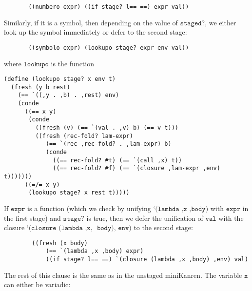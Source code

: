 \documentclass[11pt]{article}
\theoremstyle{definition}
\newcommand{\code}[1]{\texttt{#1}}
\newcommand\tab[1][1cm]{\hspace*{#1}}
\begin{document}
\begin{lstlisting}
       ((numbero expr) ((if stage? l== ==) expr val))
\end{lstlisting}
Similarly, if it is a symbol, then depending on the value of $\code{staged?}$, we either look up the symbol immediately or defer to the second stage: 
\begin{lstlisting}
       ((symbolo expr) (lookupo stage? expr env val))
\end{lstlisting}
where $\code{lookupo}$ is the function
\begin{lstlisting}
(define (lookupo stage? x env t)
  (fresh (y b rest)
    (== `((,y . ,b) . ,rest) env)
    (conde
      ((== x y)
       (conde
         ((fresh (v) (== `(val . ,v) b) (== v t)))
         ((fresh (rec-fold? lam-expr)
            (== `(rec ,rec-fold? . ,lam-expr) b)
            (conde
              ((== rec-fold? #t) (== `(call ,x) t))
              ((== rec-fold? #f) (== `(closure ,lam-expr ,env) t)))))))
      ((=/= x y)
       (lookupo stage? x rest t)))))
\end{lstlisting}
\tab If $\code{expr}$ is a function (which we check by unifying $\code{`(lambda ,x ,body)}$ with $\code{expr}$ in the first stage) and $\code{stage?}$ is true, then we defer the unification of $\code{val}$ with the closure $\code{`(closure (lambda ,x, }$ $\code{body), env)}$ to the second stage:
\begin{lstlisting}
        ((fresh (x body)
            (== `(lambda ,x ,body) expr)
            ((if stage? l== ==) `(closure (lambda ,x ,body) ,env) val)
\end{lstlisting}
\tab The rest of this clause is the same as in the unstaged miniKanren. The variable $\code{x}$ can either be variadic:
\end{document}
